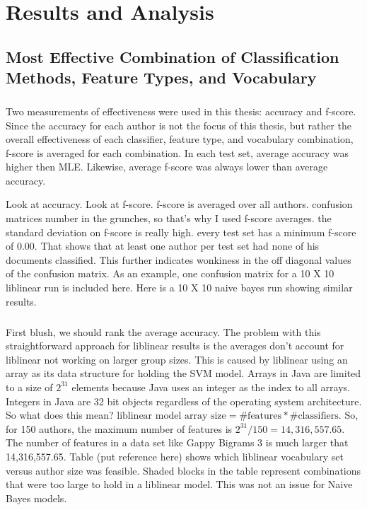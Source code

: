 \chapter{Results and Analysis}

\section{Most Effective Combination of Classification Methods, Feature Types, and Vocabulary}
	\paragraph*{} Two measurements of effectiveness were used in this thesis: accuracy and f-score.  Since the accuracy for each author is not the focus of this thesis, but rather the overall effectiveness of each classifier, feature type, and vocabulary combination, f-score is averaged for each combination.  In each test set, average accuracy was higher then MLE.  Likewise, average f-score was always lower than average accuracy.

	
	Look at accuracy.  Look at f-score.  f-score is averaged over all authors.  confusion matrices number in the grunches, so that's why I used f-score averages.  the standard deviation on f-score is really high.  every test set has a minimum f-score of 0.00.  That shows that at least one author per test set had none of his documents classified.  This further indicates wonkiness in the off diagonal values of the confusion matrix.  As an example, one confusion matrix for a 10 X 10 liblinear run is included here.  Here is a 10 X 10 naive bayes run showing similar results.
	
	\paragraph*{}First blush, we should rank the average accuracy.  The problem with this straightforward approach for liblinear results is the averages don't account for liblinear not working on larger group sizes.  This is caused by liblinear using an array as its data structure for holding the SVM model.  Arrays in Java are limited to a size of $2^31$ elements because Java uses an integer as the index to all arrays.  Integers in Java are 32 bit objects regardless of the operating system architecture.  So what does this mean?  $\text{liblinear model array size} = \text{\# features} * \text{\# classifiers}$.  So, for 150 authors, the maximum number of features is $2^31 / 150 = 14,316,557.65$.  The number of features in a data set like Gappy Bigrams 3 is much larger that 14,316,557.65.  Table (put reference here) shows which liblinear vocabulary set versus author size was feasible.  Shaded blocks in the table represent combinations that were too large to hold in a liblinear model.  This was not an issue for Naive Bayes models.
	
